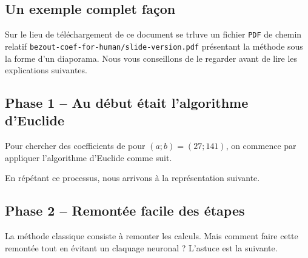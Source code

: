 \subsection{Un exemple complet façon }

Sur le lieu de téléchargement de ce document se trluve un fichier \verb+PDF+ de chemin relatif \verb+bezout-coef-for-human/slide-version.pdf+ présentant la méthode sous la forme d'un diaporama. Nous vous conseillons de le regarder avant de lire les explications suivantes.




\subsection{Phase 1 -- Au début était l'algorithme d'Euclide}

Pour chercher des coefficients de \bb pour $(a ; b) = (27 ; 141)$, on commence par appliquer l'algorithme d'Euclide  comme suit.

\begin{multicols}{2}

	\columnbreak
	
\end{multicols}

\begin{multicols}{2}

	\columnbreak
	
\end{multicols}


\medskip


En répétant ce processus, nous arrivons à la représentation suivante.





\subsection{Phase 2 -- Remontée facile des étapes}

La méthode classique consiste à remonter les calculs. Mais comment faire cette remontée tout en évitant un claquage neuronal ? L'astuce est la suivante.


